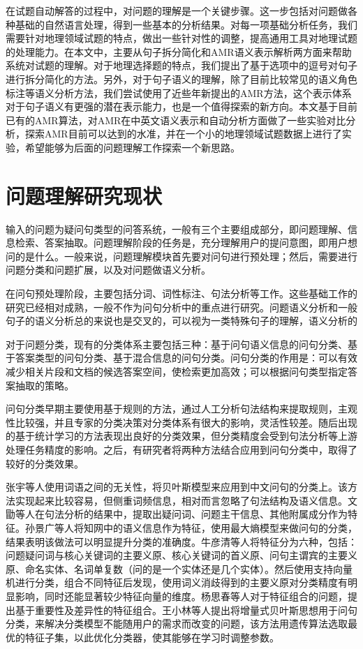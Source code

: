 \documentclass[master, winfont]{njuthesis}
\begin{document}
在试题自动解答的过程中，对问题的理解是一个关键步骤。这一步包括对问题做各种基础的自然语言处理，得到一些基本的分析结果。对每一项基础分析任务，我们需要针对地理领域试题的特点，做出一些针对性的调整，提高通用工具对地理试题的处理能力。在本文中，主要从句子拆分简化和AMR语义表示解析两方面来帮助系统对试题的理解。对于地理选择题的特点，我们提出了基于选项中的逗号对句子进行拆分简化的方法。另外，对于句子语义的理解，除了目前比较常见的语义角色标注等语义分析方法，我们尝试使用了近些年新提出的AMR方法，这个表示体系对于句子语义有更强的潜在表示能力，也是一个值得探索的新方向。本文基于目前已有的AMR算法，对AMR在中英文语义表示和自动分析方面做了一些实验对比分析，探索AMR目前可以达到的水准，并在一个小的地理领域试题数据上进行了实验，希望能够为后面的问题理解工作探索一个新思路。

\section{问题理解研究现状}
输入的问题为疑问句类型的问答系统，一般有三个主要组成部分，即问题理解、信息检索、答案抽取。问题理解阶段的任务是，充分理解用户的提问意图，即用户想问的是什么。一般来说，问题理解模块首先要对问句进行预处理；然后，需要进行问题分类和问题扩展\cite{Cao2005QA}，以及对问题做语义分析。

在问句预处理阶段，主要包括分词、词性标注、句法分析等工作。这些基础工作的研究已经相对成熟，一般不作为问句分析中的重点进行研究。问题语义分析和一般句子的语义分析总的来说也是交叉的，可以视为一类特殊句子的理解，语义分析的

对于问题分类，现有的分类体系主要包括三种：基于问句语义信息的问句分类、基于答案类型的问句分类、基于混合信息的问句分类\cite{ZhangNing2016}。问句分类的作用是：可以有效减少相关片段和文档的候选答案空间，使检索更加高效；可以根据问句类型指定答案抽取的策略。

问句分类早期主要使用基于规则的方法，通过人工分析句法结构来提取规则，主观性比较强，并且专家的分类决策对分类体系有很大的影响，灵活性较差。随后出现的基于统计学习的方法表现出良好的分类效果，但分类精度会受到句法分析等上游处理任务精度的影响。之后，有研究者将两种方法结合应用到问句分类中，取得了较好的分类效果。

张宇等人\cite{ZY2004}使用词语之间的无关性，将贝叶斯模型来应用到中文问句的分类上。该方法实现起来比较容易，但侧重词频信息，相对而言忽略了句法结构及语义信息。文勖等人\cite{Wen2006}在句法分析的结果中，提取出疑问词、问题主干信息、其他附属成分作为特征。孙景广等人\cite{Sun2007}将知网中的语义信息作为特征，使用最大熵模型来做问句的分类，结果表明该做法可以明显提升分类的准确度。牛彦清等人\cite{Niu2012}将特征分为六种，包括：问题疑问词与核心关键词的主要义原、核心关键词的首义原、问句主谓宾的主要义原、命名实体、名词单复数（问的是一个实体还是几个实体）。然后使用支持向量机进行分类，组合不同特征后发现，使用词义消歧得到的主要义原对分类精度有明显影响，同时还能显著较少特征向量的维度。杨思春等人\cite{YangSC2014}对于特征组合的问题，提出基于重要性及差异性的特征组合。王小林等人\cite{WangXL2014}提出将增量式贝叶斯思想用于问句分类，来解决分类模型不能随用户的需求而改变的问题，该方法用遗传算法选取最优的特征子集，以此优化分类器，使其能够在学习时调整参数。
\end{document}

